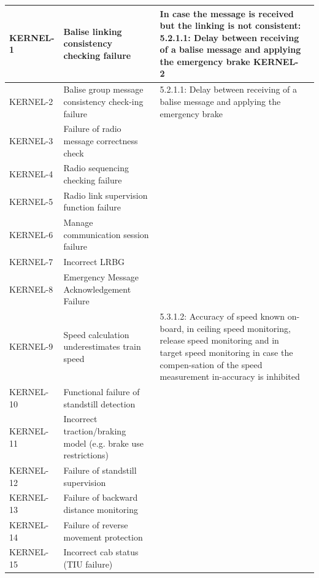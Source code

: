 \documentclass{template/openetcs_report}
\begin{document}
\begin{center}
\label{tab:KernelHaz}
\tablelasttail{\hline}

\begin{supertabular}[H]{|p{2cm}|p{4cm}|p{4cm}|p{4cm}|}
\hline KERNEL-1 & Balise linking consistency checking failure & In case the message is received but the linking is not consistent:
5.2.1.1: Delay between receiving of a balise message and applying the emergency brake
KERNEL-2 &  \\ 
\hline KERNEL-2 & Balise group message consistency check-ing failure  & 5.2.1.1: Delay between receiving of a balise message and applying the emergency brake &  \\ 
\hline KERNEL-3 & Failure of radio message correctness check &  &  \\ 
\hline KERNEL-4 & Radio sequencing checking failure &  &  \\ 
\hline KERNEL-5 & Radio link supervision function failure &  &  \\ 
\hline KERNEL-6 & Manage communication session failure &  &  \\ 
\hline KERNEL-7 & Incorrect LRBG &  &  \\ 
\hline KERNEL-8 & Emergency Message Acknowledgement Failure &  &  \\ 
\hline KERNEL-9 & Speed calculation underestimates train speed & 5.3.1.2: Accuracy of speed known on-board, in ceiling speed monitoring, release speed monitoring and in target speed monitoring in case the compen-sation of the speed measurement in-accuracy is inhibited  &  \\ 
\hline KERNEL-10 & Functional failure of standstill detection &  &  \\ 
\hline KERNEL-11 & Incorrect traction/braking model (e.g. brake use restrictions) &  &  \\ 
\hline KERNEL-12 & Failure of standstill supervision &  &  \\ 
\hline KERNEL-13 & Failure of backward distance monitoring &  &  \\ 
\hline KERNEL-14 & Failure of reverse movement protection &  &  \\ 
\hline KERNEL-15 & Incorrect cab status (TIU failure) &  &  \\ 

\end{supertabular}
\end{center}
\end{document}
